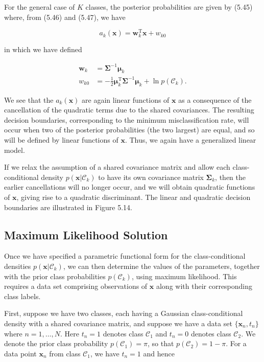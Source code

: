 \documentclass{article}
\begin{document}
For the general case of $K$ classes, the posterior probabilities are given by (5.45) where, from (5.46) and (5.47), we have

\begin{equation}
a_{k}(\mathbf{x})=\mathbf{w}_{k}^{\mathrm{T}}\mathbf{x}+w_{k0}
\tag{5.51}
\end{equation}

in which we have defined

\begin{align}
\mathbf{w}_{k} &= \boldsymbol{\Sigma}^{-1}\boldsymbol{\mu}_{k} \tag{5.52}\\ 
w_{k0} &= -\frac{1}{2}\boldsymbol{\mu}_{k}^{\mathrm{T}}\boldsymbol{\Sigma}^{-1}\boldsymbol{\mu}_{k}+\ln p(\mathcal{C}_{k}). \tag{5.53}
\end{align}

We see that the $a_{k}(\mathbf{x})$ are again linear functions of $\mathbf{x}$ as a consequence of the cancellation of the quadratic terms due to the shared covariances. The resulting decision boundaries, corresponding to the minimum misclassification rate, will occur when two of the posterior probabilities (the two largest) are equal, and so will be defined by linear functions of $\mathbf{x}$. Thus, we again have a generalized linear model.

If we relax the assumption of a shared covariance matrix and allow each class-conditional density $p(\mathbf{x}|\mathcal{C}_{k})$ to have its own covariance matrix $\boldsymbol{\Sigma}_{k}$, then the earlier cancellations will no longer occur, and we will obtain quadratic functions of $\mathbf{x}$, giving rise to a quadratic discriminant. The linear and quadratic decision boundaries are illustrated in Figure 5.14.

\subsection{Maximum Likelihood Solution}

Once we have specified a parametric functional form for the class-conditional densities $p(\mathbf{x}|\mathcal{C}_{k})$, we can then determine the values of the parameters, together with the prior class probabilities $p(\mathcal{C}_{k})$, using maximum likelihood. This requires a data set comprising observations of $\mathbf{x}$ along with their corresponding class labels.

First, suppose we have two classes, each having a Gaussian class-conditional density with a shared covariance matrix, and suppose we have a data set $\{\mathbf{x}_{n},t_{n}\}$ where $n=1,\ldots,N$. Here $t_{n}=1$ denotes class $\mathcal{C}_{1}$ and $t_{n}=0$ denotes class $\mathcal{C}_{2}$. We denote the prior class probability $p(\mathcal{C}_{1})=\pi$, so that $p(\mathcal{C}_{2})=1-\pi$. For a data point $\mathbf{x}_{n}$ from class $\mathcal{C}_{1}$, we have $t_{n}=1$ and hence
\end{document}
